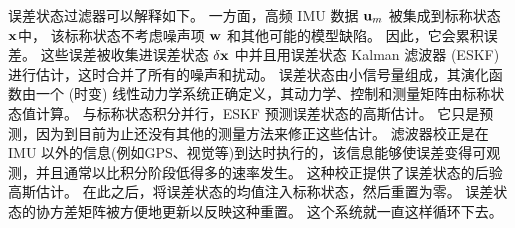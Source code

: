 误差状态过滤器可以解释如下。 
一方面，高频 IMU 数据 ${\bf u}_m$ 被集成到标称状态 ${\bf x}$中， 
该标称状态不考虑噪声项 ${\bf w}$ 和其他可能的模型缺陷。 
因此，它会累积误差。 
这些误差被收集进误差状态 $\delta{\bf x}$ 中并且用误差状态 Kalman 滤波器 (ESKF)进行估计，这时合并了所有的噪声和扰动。 
误差状态由小信号量组成，其演化函数由一个 (时变) 线性动力学系统正确定义，其动力学、控制和测量矩阵由标称状态值计算。 
与标称状态积分并行，ESKF 预测误差状态的高斯估计。 
它只是预测，因为到目前为止还没有其他的测量方法来修正这些估计。 
滤波器校正是在 IMU 以外的信息(例如GPS、视觉等)到达时执行的，该信息能够使误差变得可观测，并且通常以比积分阶段低得多的速率发生。 
这种校正提供了误差状态的后验高斯估计。 
在此之后，将误差状态的均值注入标称状态，然后重置为零。 
误差状态的协方差矩阵被方便地更新以反映这种重置。 
这个系统就一直这样循环下去。

